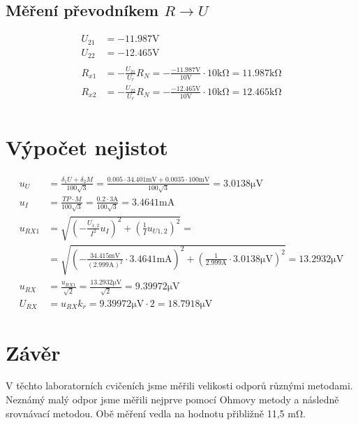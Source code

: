 \documentclass{article}
\begin{document}
\subsection{Měření převodníkem $R \to U$}
$$
\begin{aligned}
	U_{21} &= -11.987 \si{\volt}\\
	U_{22} &= -12.465 \si{\volt}\\
	\\
	R_{x1} &= -\frac{U_{21}}{U_r}R_N = -\frac{-11.987 \si{\volt}}{10\si{\volt}}\cdot 10\si{\kilo\ohm} = 11.987\si{\kilo\ohm}\\
	R_{x2} &= -\frac{U_{22}}{U_r}R_N = -\frac{-12.465 \si{\volt}}{10\si{\volt}}\cdot 10\si{\kilo\ohm} = 12.465\si{\kilo\ohm}\\
\end{aligned}
$$
\section{Výpočet nejistot}
$$
\begin{aligned}
	u_U &= \frac{\delta_1U+\delta_2M}{100\sqrt{3}} = \frac{0.005 \cdot 34.401\si{\milli\volt}+0.0035 \cdot 100\si{\milli\volt}}{100\sqrt{3}}=3.0138\si{\micro\volt}\\
	u_I &= \frac{TP \cdot M}{100\sqrt{3}} = \frac{0.2 \cdot 3\si{\ampere}}{100\sqrt{3}} = 3.4641\si{\milli\ampere}\\
	u_{RX1} &= \sqrt{(-\frac{U_{1,2}}{I^2}u_I)^2+(\frac{1}{I}u_{U1,2})^2}= \\ &= \sqrt{(-\frac{34.415 \si{\milli\volt}}{(2.999 \si{\ampere})^2} \cdot 3.4641\si{\milli\ampere})^2+(\frac{1}{2.999 \si{\ampere}} \cdot 3.0138\si{\micro\volt})^2} = 13.2932 \si{\micro\volt}\\
	u_{RX} &= \frac{u_{RX1}}{\sqrt{2}} = \frac{13.2932 \si{\micro\volt}}{\sqrt{2}} = 9.39972 \si{\micro\volt}\\
	U_{RX} &= u_{RX} k_r = 9.39972 \si{\micro\volt} \cdot 2 = 18.7918 \si{\micro\volt}
\end{aligned}
$$
\section{Závěr}
V těchto laboratorních cvičeních jsme měřili velikosti odporů různými metodami. Neznámý malý odpor jsme měřili nejprve pomocí Ohmovy metody a následně srovnávací metodou. Obě měření vedla na hodnotu přibližně 11,5 \si{\milli\ohm}.
\end{document}

